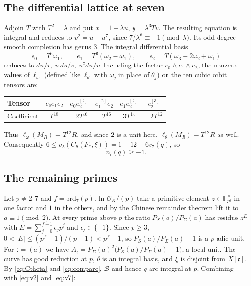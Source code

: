 \documentclass[11pt]{amsart}
\theoremstyle{remark}
\theoremstyle{definition}
\newcommand{\F}{\mathbb{F}}
\newcommand{\OK}{\mathcal{O}_K}
\newcommand{\Bn}{\mathcal{B}}
\begin{document}
\subsection{The differential lattice at seven}
Adjoin $T$ with $T^2=\lambda$ and put $x=1+\lambda u$, $y=\lambda^3Tv$. The resulting equation is integral and reduces to $v^2=u-u^7$, since $7/\lambda^6\equiv-1\pmod\lambda$. Its odd-degree smooth completion has genus $3$. The integral differential basis
\[
e_0=T^5\omega_1,\qquad e_1=T^3(\omega_2-\omega_1),\qquad e_2=T(\omega_3-2\omega_2+\omega_1)
\]
reduces to $du/v,\ u\,du/v,\ u^2du/v$. Including the factor $e_0\wedge e_1\wedge e_2$, the nonzero values of $\ell_\omega$ (defined like $\ell_\theta$ with $\omega_j$ in place of $\theta_j$) on the ten cubic orbit tensors are:
\begin{center}
\begin{tabular}{@{}lccccc@{}}
\toprule
Tensor & $e_0e_1e_2$ & $e_0e_2^{[2]}$ & $e_1^{[2]}e_2$ & $e_1e_2^{[2]}$ & $e_2^{[3]}$\\
\midrule
Coefficient & $T^{18}$ & $-2T^{16}$ & $-T^{16}$ & $3T^{14}$ & $-2T^{12}$\\
\bottomrule
\end{tabular}
\end{center}
Thus $\ell_\omega(M_R)=T^{12}R$, and since $2$ is a unit here, $\ell_\theta(M_R)=T^{12}R$ as well. Consequently $6\le v_\lambda(C_\theta(F_*,\xi))=1+12+6v_7(q)$, so
\begin{equation}\label{eq:v7}
v_7(q)\ge-1.
\end{equation}

\subsection{The remaining primes}
Let $p\ne2,7$ and $f=\mathrm{ord}_7(p)$. In $\OK/(p)$ take a primitive element $z\in\F_{p^f}^\times$ in one factor and $1$ in the others, and by the Chinese remainder theorem lift it to $a\equiv1\pmod 2$. At every prime above $p$ the ratio $P_S(a)/P_\Sigma(a)$ has residue $z^E$ with $E=\sum_{j=0}^{f-1}\epsilon_jp^j$ and $\epsilon_j\in\{\pm1\}$. Since $p\ge3$, $0<|E|\le(p^f-1)/(p-1)<p^f-1$, so $P_S(a)/P_\Sigma(a)-1$ is a $p$-adic unit. For $\mathfrak c=(a)$ we have $A_{\mathfrak c}=P_\Sigma(a)^2\bigl(P_S(a)/P_\Sigma(a)-1\bigr)$, a local unit. The curve has good reduction at $p$, $\theta$ is an integral basis, and $\xi$ is disjoint from $X[\mathfrak c]$. By \eqref{eq:Ctheta} and \eqref{eq:compare}, $\Bn$ and hence $q$ are integral at $p$. Combining with \eqref{eq:v2} and \eqref{eq:v7}:
\end{document}
